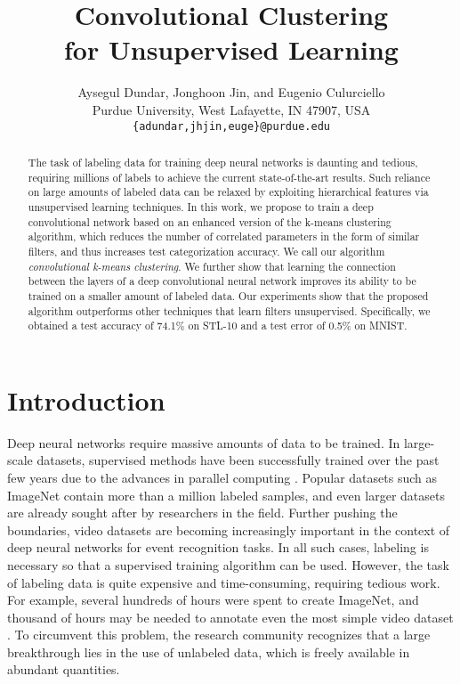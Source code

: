 \documentclass{article} \usepackage{iclr2016_workshop,times}
\title{Convolutional Clustering\\ for Unsupervised Learning}
\author{
Aysegul Dundar, Jonghoon Jin,  and Eugenio Culurciello \\
Purdue University, West Lafayette, IN 47907, USA \\
\texttt{\{adundar,jhjin,euge\}@purdue.edu} \\
}
\begin{document}
\maketitle





\begin{abstract}
The task of labeling data for training deep neural networks is daunting and tedious, requiring millions of labels to achieve the current state-of-the-art results. Such reliance on large amounts of labeled data can be relaxed by exploiting hierarchical features via unsupervised learning techniques.
In this work, we propose to train a deep convolutional network based on an enhanced version of the k-means clustering algorithm, which reduces the number of correlated parameters in the form of similar filters, and thus increases test categorization accuracy.
We call our algorithm \emph{convolutional k-means clustering}. 
We further show that learning the connection between the layers of a deep convolutional neural network improves its ability to be trained on a smaller amount of labeled data.
Our experiments show that the proposed algorithm outperforms other techniques that learn filters unsupervised. Specifically,  we obtained a test accuracy of 74.1\% on STL-10 and a test error of 0.5\% on MNIST.
\end{abstract}
\section{Introduction}

Deep neural networks require massive amounts of data to be trained. In large-scale datasets, supervised methods have been successfully trained over the past few years due to the advances in parallel computing \citep{simonyan2014very, szegedy2014going}. Popular datasets such as ImageNet \citep{deng2009imagenet} contain more than a million labeled samples, and even larger datasets are already sought after by researchers in the field. Further pushing the boundaries, video datasets are becoming increasingly important in the context of deep neural networks for event recognition tasks. In all such cases, labeling is necessary so that a supervised training algorithm can be used. However, the task of labeling data is quite expensive and time-consuming, requiring tedious work. For example, several hundreds of hours were spent to create ImageNet, and thousand of hours may be needed to annotate even the most simple video dataset \citep{ILSVRC15}. To circumvent this problem, the research community recognizes that a large breakthrough lies in the use of unlabeled data, which is freely available in abundant quantities. 
\end{document}
